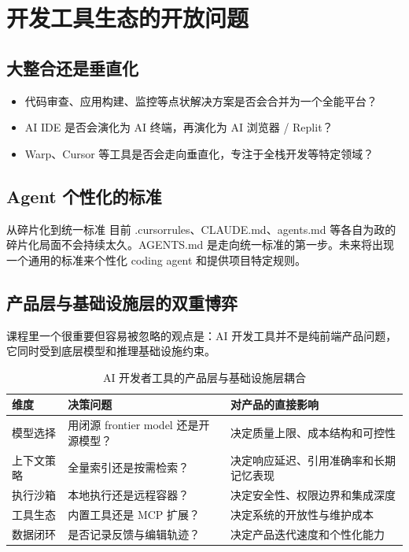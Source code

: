 \section{开发工具生态的开放问题}

\subsection{大整合还是垂直化}

\begin{itemize}
    \item 代码审查、应用构建、监控等点状解决方案是否会合并为一个全能平台？
    \item AI IDE 是否会演化为 AI 终端，再演化为 AI 浏览器 / Replit？
    \item Warp、Cursor 等工具是否会走向垂直化，专注于全栈开发等特定领域？
\end{itemize}

\subsection{Agent 个性化的标准}

\begin{importantbox}{从碎片化到统一标准}
目前 .cursorrules、CLAUDE.md、agents.md 等各自为政的碎片化局面不会持续太久。AGENTS.md 是走向统一标准的第一步。未来将出现一个通用的标准来个性化 coding agent 和提供项目特定规则。
\end{importantbox}

\subsection{产品层与基础设施层的双重博弈}

课程里一个很重要但容易被忽略的观点是：AI 开发工具并不是纯前端产品问题，它同时受到底层模型和推理基础设施约束。

\begin{table}[H]
\centering
\begin{tabular}{p{} p{} p{}}
\toprule
维度 & 决策问题 & 对产品的直接影响 \\
\midrule
模型选择 & 用闭源 frontier model 还是开源模型？ & 决定质量上限、成本结构和可控性 \\
上下文策略 & 全量索引还是按需检索？ & 决定响应延迟、引用准确率和长期记忆表现 \\
执行沙箱 & 本地执行还是远程容器？ & 决定安全性、权限边界和集成深度 \\
工具生态 & 内置工具还是 MCP 扩展？ & 决定系统的开放性与维护成本 \\
数据闭环 & 是否记录反馈与编辑轨迹？ & 决定产品迭代速度和个性化能力 \\
\bottomrule
\end{tabular}
\caption{AI 开发者工具的产品层与基础设施层耦合}
\end{table}

